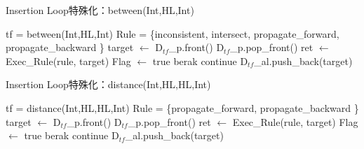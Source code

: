 \begin{algorithm}
    \caption{Insertion Loop特殊化：between(Int,HL,Int)}
\begin{algorithmic}
    \scriptsize
    \Require tf = between(Int,HL,Int)
    \Require Rule = \{inconsistent, intersect, propagate\_forward, propagate\_backward \}
            \State target $\gets$  $\text{D}_{tf}$\_p.front()
            \State $\text{D}_{tf}$\_p.pop\_front()
                \State ret $\gets$ Exec\_Rule(rule, target)
                 
                    \State Flag $\gets$ true
                    \State berak
                \EndIf
            \EndFor
                \State continue
            \EndIf
            \State $\text{D}_{tf}$\_al.push\_back(target)
        \EndWhile
    \EndProcedure
\end{algorithmic}
\end{algorithm}

\begin{algorithm}
    \caption{Insertion Loop特殊化：distance(Int,HL,HL,Int)}
\begin{algorithmic}
    \scriptsize
    \Require tf = distance(Int,HL,HL,Int)
    \Require Rule = \{propagate\_forward, propagate\_backward \}
            \State target $\gets$  $\text{D}_{tf}$\_p.front()
            \State $\text{D}_{tf}$\_p.pop\_front()
                \State ret $\gets$ Exec\_Rule(rule, target)
                 
                    \State Flag $\gets$ true
                    \State berak
                \EndIf
            \EndFor
                \State continue
            \EndIf
            \State $\text{D}_{tf}$\_al.push\_back(target)
        \EndWhile
    \EndProcedure
\end{algorithmic}
\end{algorithm}

